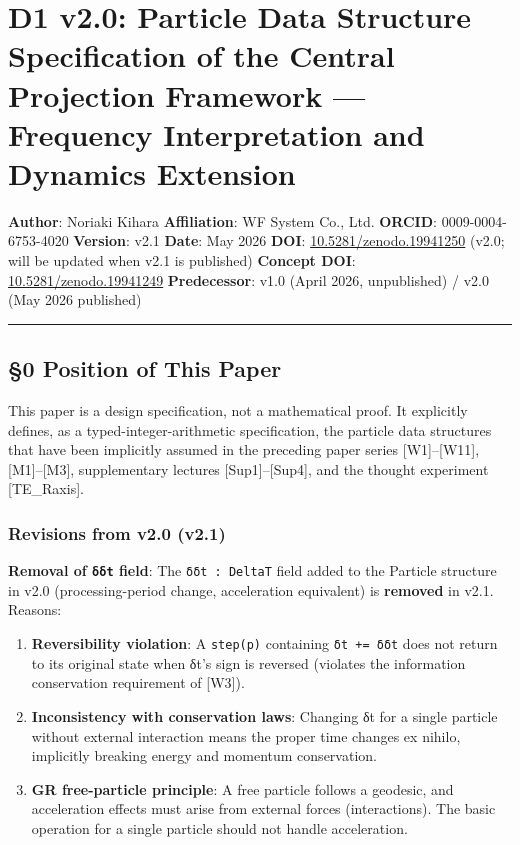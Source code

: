 \documentclass[a4paper,11pt]{article}
\providecommand{\tightlist}{\setlength{\itemsep}{0pt}\setlength{\parskip}{0pt}}
\begin{document}
\section{D1 v2.0: Particle Data Structure Specification of the Central
Projection Framework --- Frequency Interpretation and Dynamics
Extension}\label{d1-v2.0-particle-data-structure-specification-of-the-central-projection-framework-frequency-interpretation-and-dynamics-extension}

\textbf{Author}: Noriaki Kihara \textbf{Affiliation}: WF System Co.,
Ltd. \textbf{ORCID}: 0009-0004-6753-4020 \textbf{Version}: v2.1
\textbf{Date}: May 2026 \textbf{DOI}:
\href{https://doi.org/10.5281/zenodo.19941250}{10.5281/zenodo.19941250}
(v2.0; will be updated when v2.1 is published) \textbf{Concept DOI}:
\href{https://doi.org/10.5281/zenodo.19941249}{10.5281/zenodo.19941249}
\textbf{Predecessor}: v1.0 (April 2026, unpublished) / v2.0 (May 2026
published)

\begin{center}\rule{0.5\linewidth}{0.5pt}\end{center}

\subsection{§0 Position of This Paper}\label{position-of-this-paper}

This paper is a design specification, not a mathematical proof. It
explicitly defines, as a typed-integer-arithmetic specification, the
particle data structures that have been implicitly assumed in the
preceding paper series {[}W1{]}--{[}W11{]}, {[}M1{]}--{[}M3{]},
supplementary lectures {[}Sup1{]}--{[}Sup4{]}, and the thought
experiment {[}TE\_Raxis{]}.

\subsubsection{Revisions from v2.0
(v2.1)}\label{revisions-from-v2.0-v2.1}

\textbf{Removal of \texttt{δδt} field}: The \texttt{δδt\ :\ DeltaT}
field added to the Particle structure in v2.0 (processing-period change,
acceleration equivalent) is \textbf{removed} in v2.1. Reasons:

\begin{enumerate}
\def\labelenumi{\arabic{enumi}.}
\tightlist
\item
  \textbf{Reversibility violation}: A \texttt{step(p)} containing
  \texttt{δt\ +=\ δδt} does not return to its original state when δt's
  sign is reversed (violates the information conservation requirement of
  {[}W3{]}).
\item
  \textbf{Inconsistency with conservation laws}: Changing δt for a
  single particle without external interaction means the proper time
  changes ex nihilo, implicitly breaking energy and momentum
  conservation.
\item
  \textbf{GR free-particle principle}: A free particle follows a
  geodesic, and acceleration effects must arise from external forces
  (interactions). The basic operation for a single particle should not
  handle acceleration.
\end{enumerate}
\end{document}
